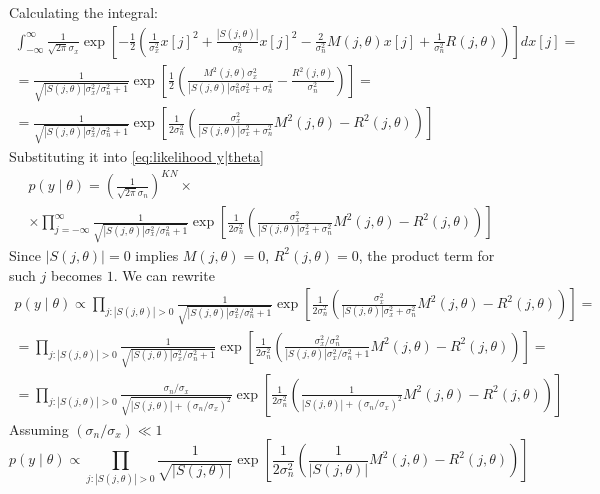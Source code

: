 \documentclass[a4paper]{article}
\begin{document}
Calculating the integral:
\begin{multline}
\int_{-\infty}^\infty \frac{1}{\sqrt{2\pi}\sigma_x} \exp\left[-\frac{1}{2} \left( \frac{1}{\sigma_x^2}x[j]^2  + \frac{|S(j,\theta)|}{\sigma_n^2} x[j]^2 - \frac{2}{\sigma_n^2} M(j,\theta) x[j] + \frac{1}{\sigma_n^2}R(j,\theta) \right)\right] dx[j] = \\
= \frac{1} {\sqrt{|S(j,\theta)|\sigma_x^2/\sigma_n^2+1}}\exp \left[{\frac{1}{2} \left(\frac{M^2(j,\theta)  \sigma_x^2}{|S(j,\theta)| \sigma_n^2 \sigma_x^2+\sigma_n^4}-\frac{R^2(j,\theta) }{\sigma_n^2}\right)}\right] = \\
= \frac{1} {\sqrt{|S(j,\theta)|\sigma_x^2/\sigma_n^2+1}} \exp \left[{\frac{1}{2\sigma_n^2} \left(\frac{  \sigma_x^2}{|S(j,\theta)| \sigma_x^2+\sigma_n^2}M^2(j,\theta)-R^2(j,\theta)\right)}\right]
\end{multline}
Substituting it into \eqref{eq:likelihood y|theta}
\begin{multline}
p(y \mid \theta) = \left(\frac{1}{\sqrt{2\pi} \sigma_n}\right)^{KN} \times \\ \times \prod_{j=-\infty}^\infty  \frac{1} {\sqrt{|S(j,\theta)|\sigma_x^2/\sigma_n^2+1}} \exp \left[{\frac{1}{2\sigma_n^2} \left(\frac{  \sigma_x^2}{|S(j,\theta)| \sigma_x^2+\sigma_n^2}M^2(j,\theta)-R^2(j,\theta)\right)}\right]
\end{multline}
Since $|S(j,\theta)|=0$ implies $M(j,\theta)=0$, $R^2(j, \theta)=0$, the product term for such $j$ becomes $1$. We can rewrite
\begin{multline}
p(y \mid \theta) \propto \prod_{j : |S(j,\theta)|>0} \frac{1} {\sqrt{|S(j,\theta)|\sigma_x^2/\sigma_n^2+1}} \exp \left[{\frac{1}{2\sigma_n^2} \left(\frac{  \sigma_x^2}{|S(j,\theta)| \sigma_x^2+\sigma_n^2}M^2(j,\theta)-R^2(j,\theta)\right)}\right]= \\
= \prod_{j : |S(j,\theta)|>0} \frac{1} {\sqrt{|S(j,\theta)|\sigma_x^2/\sigma_n^2+1}} \exp \left[{\frac{1}{2\sigma_n^2} \left(\frac{  \sigma_x^2 / \sigma_n^2}{|S(j,\theta)| \sigma_x^2 / \sigma_n^2+1}M^2(j,\theta)-R^2(j,\theta)\right)}\right] = \\
= \prod_{j : |S(j,\theta)|>0} \frac{\sigma_n/\sigma_x} {\sqrt{|S(j,\theta)|+(\sigma_n/\sigma_x)^2}} \exp \left[{\frac{1}{2\sigma_n^2} \left(\frac{1}{|S(j,\theta)|+(\sigma_n/\sigma_x)^2}M^2(j,\theta)-R^2(j,\theta)\right)}\right]
\end{multline}
Assuming $(\sigma_n/\sigma_x) \ll 1$
\begin{equation}
p(y \mid \theta) \propto  \prod_{j : |S(j,\theta)|>0} \frac{1} {\sqrt{|S(j,\theta)|}} \exp \left[{\frac{1}{2\sigma_n^2} \left(\frac{1}{|S(j,\theta)|}M^2(j,\theta)-R^2(j,\theta)\right)}\right]
\end{equation}
\end{document}
